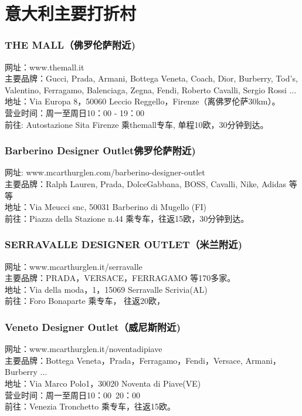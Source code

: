 \section{意大利主要打折村}
\begin{multicols}{2}

\subsubsection{THE MALL（佛罗伦萨附近)}
\noindent 网址：www.themall.it\\
主要品牌：Gucci, Prada, Armani, Bottega Veneta, Coach, Dior, Burberry, Tod’s, Valentino, Ferragamo, Balenciaga, Zegna, Fendi, Roberto Cavalli, Sergio Rossi ...\\
地址：Via Europa 8，50060 Leccio Reggello，Firenze（离佛罗伦萨30km）。\\
营业时间：周一至周日10：00 - 19：00 \\
前往: Autostazione Sita Firenze 乘themall专车, 单程10欧，30分钟到达。

\subsubsection{Barberino Designer Outlet佛罗伦萨附近)}
\noindent 网址: www.mcarthurglen.com/barberino-designer-outlet\\
主要品牌：Ralph Lauren, Prada, DolceGabbana, BOSS, Cavalli, Nike, Adidas 等等\\
地址：Via Meucci snc, 50031 Barberino di Mugello (FI)\\
前往：Piazza della Stazione n.44 乘专车，往返15欧，30分钟到达。
 
\subsubsection{SERRAVALLE DESIGNER OUTLET（米兰附近)}
\noindent 网址：www.mcarthurglen.it/serravalle\\
主要品牌：PRADA，VERSACE，FERRAGAMO 等170多家。\\
地址：Via della moda，1，15069 Serravalle Scrivia(AL)\\
前往：Foro Bonaparte 乘专车， 往返20欧，
 
\subsubsection{Veneto Designer Outlet（威尼斯附近)}
\noindent 网址：www.mcarthurglen.it/noventadipiave \\
主要品牌：Bottega Veneta，Prada，Ferragamo，Fendi，Versace, Armani，Burberry ... \\
地址：Via Marco Polo1，30020 Noventa di Piave(VE) \\
营业时间：周一至周日10：00~20：00\\
前往：Venezia Tronchetto 乘专车，往返15欧。
 

\end{multicols}

